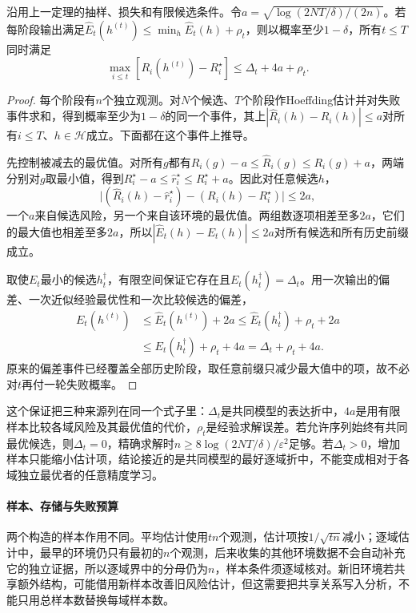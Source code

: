 \begin{theorem}[有限候选的逐历史分布保证]
\label{thm:continual-uniform-finite}
沿用上一定理的抽样、损失和有限候选条件。令$a=\sqrt{\log(2NT/\delta)/(2n)}$。若每阶段输出满足$\widehat E_t(h^{(t)})\leq\min_h\widehat E_t(h)+\rho_t$，则以概率至少$1-\delta$，所有$t\leq T$同时满足
\begin{equation}
 \max_{i\leq t}[R_i(h^{(t)})-R_i^\star]
 \leq\Delta_t+4a+\rho_t .
 \label{eq:continual-uniform-bound}
\end{equation}
\end{theorem}
\begin{proof}
每个阶段有$n$个独立观测。对$N$个候选、$T$个阶段作Hoeffding估计并对失败事件求和，得到概率至少为$1-\delta$的同一个事件，其上$|\widehat R_i(h)-R_i(h)|\leq a$对所有$i\leq T$、$h\in\mathcal H$成立。下面都在这个事件上推导。

先控制被减去的最优值。对所有$g$都有$R_i(g)-a\leq\widehat R_i(g)\leq R_i(g)+a$，两端分别对$g$取最小值，得到$R_i^\star-a\leq\widehat r_i^\star\leq R_i^\star+a$。因此对任意候选$h$，
\[
 \bigl|(\widehat R_i(h)-\widehat r_i^\star)-(R_i(h)-R_i^\star)\bigr|\leq2a ,
\]
一个$a$来自候选风险，另一个来自该环境的最优值。两组数逐项相差至多$2a$，它们的最大值也相差至多$2a$，所以$|\widehat E_t(h)-E_t(h)|\leq2a$对所有候选和所有历史前缀成立。

取使$E_t$最小的候选$h_t^\dagger$，有限空间保证它存在且$E_t(h_t^\dagger)=\Delta_t$。用一次输出的偏差、一次近似经验最优性和一次比较候选的偏差，
\[
 \begin{aligned}
 E_t(h^{(t)})&\leq\widehat E_t(h^{(t)})+2a
 \leq\widehat E_t(h_t^\dagger)+\rho_t+2a\\
 &\leq E_t(h_t^\dagger)+\rho_t+4a=\Delta_t+\rho_t+4a .
 \end{aligned}
\]
原来的偏差事件已经覆盖全部历史阶段，取任意前缀只减少最大值中的项，故不必对$t$再付一轮失败概率。
\end{proof}

这个保证把三种来源列在同一个式子里：$\Delta_t$是共同模型的表达折中，$4a$是用有限样本比较各域风险及其最优值的代价，$\rho_t$是经验求解误差。若允许序列始终有共同最优候选，则$\Delta_t=0$，精确求解时$n\geq8\log(2NT/\delta)/\varepsilon^2$足够。若$\Delta_t>0$，增加样本只能缩小估计项，结论接近的是共同模型的最好逐域折中，不能变成相对于各域独立最优者的任意精度学习。

\paragraph{样本、存储与失败预算}
两个构造的样本作用不同。平均估计使用$tn$个观测，估计项按$1/\sqrt{tn}$减小；逐域估计中，最早的环境仍只有最初的$n$个观测，后来收集的其他环境数据不会自动补充它的独立证据，所以逐域界中的分母仍为$n$，样本条件须逐域核对。新旧环境若共享额外结构，可能借用新样本改善旧风险估计，但这需要把共享关系写入分析，不能只用总样本数替换每域样本数。

